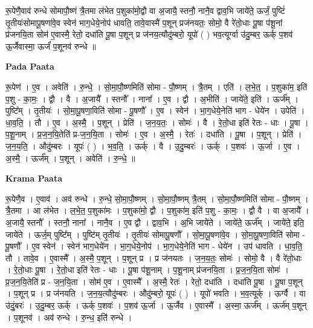 \documentclass[17pt]{extarticle}
\begin{document}
रू॒पेणै॒वाव॑ रुन्धे सोमापौ॒ष्णं त्रै॒तमा ल॑भेत प॒शुका॑मो॒द्वौ वा अ॒जायै॒ स्तनौ॒ नानै॒व द्वाव॒भि जाये॑ते॒ ऊर्जं॒ पुष्टिं॑ तृ॒तीयः॑सोमापू॒षणा॑वे॒व स्वेन॑ भाग॒धेये॒नोप॑ धावति॒ तावे॒वास्मै॑ प॒शून् प्रज॑नयतः॒ सोमो॒ वै रे॑तो॒धाः पू॒षा प॑शू॒नां प्र॑जनयि॒ता सोम॑ ए॒वास्मै॒ रेतो॒ दधा॑ति पू॒षा प॒शून् प्र ज॑नय॒त्यौदु॑म्बरो॒ यूपो॑ ( ) भव॒त्यूर्ग्वा उ॑दु॒म्बर॒ ऊर्क् प॒शव॑ ऊ॒र्जैवास्मा॒ ऊर्जं॑ प॒शूनव॑ रुन्धे ॥ \newline

\textbf{Pada Paata} \newline

रू॒पेण॑ । ए॒व । अवेति॑ । रु॒न्धे॒ । सो॒मा॒पौ॒ष्णमिति॑ सोमा - पौ॒ष्णम् । त्रै॒तम् । एति॑ । ल॒भे॒त॒ । प॒शुका॑म॒ इति॑ प॒शु - का॒मः॒ । द्वौ । वै । अ॒जायै᳚ । स्तनौ᳚ । नाना᳚ । ए॒व । द्वौ । अ॒भीति॑ । जाये॑ते॒ इति॑ । ऊर्ज᳚म् । पुष्टि᳚म् । तृ॒तीयः॑ । सो॒मा॒पू॒षणा॒विति॑ सोमा - पू॒षणौ᳚ । ए॒व । स्वेन॑ । भा॒ग॒धेये॒नेति॑ भाग - धेये॑न । उपेति॑ । धा॒व॒ति॒ । तौ । ए॒व । अ॒स्मै॒ । प॒शून् । प्रेति॑ । ज॒न॒य॒तः॒ । सोमः॑ । वै । रे॒तो॒धा इति॑ रेतः - धाः । पू॒षा । प॒शू॒नाम् । प्र॒ज॒न॒यि॒तेति॑ प्र-ज॒न॒यि॒ता । सोमः॑ । ए॒व । अ॒स्मै॒ । रेतः॑ । दधा॑ति । पू॒षा । प॒शून् । प्रेति॑ । ज॒न॒य॒ति॒ । औदु॑म्बरः । यूपः॑ ( ) । भ॒व॒ति॒ । ऊर्क् । वै । उ॒दु॒म्बरः॑ । ऊर्क् । प॒शवः॑ । ऊ॒र्जा । ए॒व । अ॒स्मै॒ । ऊर्ज᳚म् । प॒शून् । अवेति॑ । रु॒न्धे॒ ॥  \newline


\textbf{Krama Paata} \newline

रू॒पेणै॒व । ए॒वाव॑ । अव॑ रुन्धे । रु॒न्धे॒ सो॒मा॒पौ॒ष्णम् । सो॒मा॒पौ॒ष्णम् त्रै॒तम् । सो॒मा॒पौ॒ष्णमिति॑ सोमा - पौ॒ष्णम् । त्रै॒तमा । आ ल॑भेत । ल॒भे॒त॒ प॒शुका॑मः । प॒शुका॑मो॒ द्वौ । प॒शुका॑म॒ इति॑ प॒शु - का॒मः॒ । द्वौ वै । वा अ॒जायै᳚ । अ॒जायै॒ स्तनौ᳚ । स्तनौ॒ नाना᳚ । नानै॒व । ए॒व द्वौ । द्वाव॒भि । अ॒भि जाये॑ते । जाये॑ते॒ ऊर्ज᳚म् । जाये॑ते॒ इति॒ जाये॑ते । ऊर्ज॒म् पुष्टि᳚म् । पुष्टि॑म् तृ॒तीयः॑ । तृ॒तीयः॑ सोमापू॒षणौ᳚ । सो॒मा॒पू॒षणा॑वे॒व । सो॒मा॒पू॒षणा॒विति॑ सोमा - पू॒षणौ᳚ । ए॒व स्वेन॑ । स्वेन॑ भाग॒धेये॑न । भा॒ग॒धेये॒नोप॑ । भा॒ग॒धेये॒नेति॑ भाग - धेये॑न । उप॑ धावति । धा॒व॒ति॒ तौ । तावे॒व । ए॒वास्मै᳚ । अ॒स्मै॒ प॒शून् । प॒शून् प्र । प्र ज॑नयतः । ज॒न॒य॒तः॒ सोमः॑ । सोमो॒ वै । वै रे॑तो॒धाः । रे॒तो॒धाः पू॒षा । रे॒तो॒धा इति॑ रेतः - धाः । पू॒षा प॑शू॒नाम् । प॒शू॒नाम् प्र॑जनयि॒ता । प्र॒ज॒न॒यि॒ता सोमः॑ । प्र॒ज॒न॒यि॒तेति॑ प्र - ज॒न॒यि॒ता । सोम॑ ए॒व । ए॒वास्मै᳚ । अ॒स्मै॒ रेतः॑ । रेतो॒ दधा॑ति । दधा॑ति पू॒षा । पू॒षा प॒शून् । प॒शून् प्र । प्र ज॑नयति । ज॒न॒य॒त्यौदु॑म्बरः । औदु॑म्बरो॒ यूपः॑ ( ) । यूपो॑ भवति । भ॒व॒त्यूर्क् । ऊर्ग्वै । वा उ॑दुं॒बरः॑ । उ॒दु॒म्बर॒ ऊर्क् । ऊर्क् प॒शवः॑ । प॒शव॑ ऊ॒र्जा । ऊ॒र्जैव । ए॒वास्मै᳚ । अ॒स्मा॒ ऊर्ज᳚म् । ऊर्ज॑म् प॒शून् । प॒शूनव॑ । अव॑ रुन्धे । रु॒न्ध॒ इति॑ रुन्धे । \newline
\end{document}

